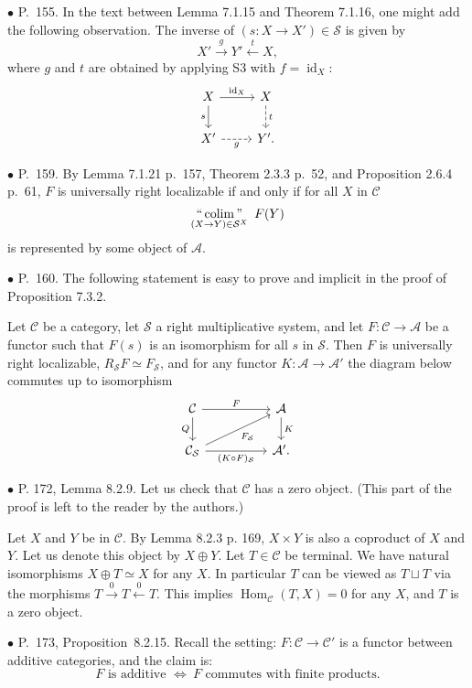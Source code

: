 \documentclass[12pt]{article}
\theoremstyle{remark}%
\newcommand{\bu}{\bullet}
\newcommand{\n}{\noindent}
\newcommand{\A}{\mathcal A}
\newcommand{\C}{\mathcal C}
\newcommand{\SSS}{\mathcal S}
\newcommand{\xl}{\xleftarrow}
\newcommand{\xr}{\xrightarrow}
\newcommand{\pr}{Proposition}
\DeclareMathOperator*{\coli}{colim}
\DeclareMathOperator*{\icolim}{``\coli"}
\DeclareMathOperator{\id}{id}
\DeclareMathOperator{\h}{Hom}
\begin{document}

\n$\bu$ P.~155. In the text between Lemma 7.1.15 and Theorem 7.1.16, one might add the following observation. The inverse of $(s:X\to X')\in\mathcal S$ is given by 
$$
X'\overset{g}{\to}Y'\overset{t}{\leftarrow}X,
$$
where $g$ and $t$ are obtained by applying S3 with $f=\id_X$:
$$
\begin{tikzcd}
X\ar{r}{\id_X}\ar{d}[swap]{s}&X\ar[dashed]{d}{t}\\ X'\ar[dashed]{r}[swap]{g}&Y'.
\end{tikzcd}
$$ 


\n$\bu$ P.~159. By Lemma 7.1.21 p.~157, Theorem 2.3.3 p.~52, and Proposition 2.6.4 p.~61, $F$ is universally right localizable if and only if for all $X$ in $\C$ 
$$
\icolim_{(X\to Y)\in\SSS^X}\ F(Y) 
$$
is represented by some object of $\A$. 


\n$\bu$ P.~160. The following statement is easy to prove and implicit in the proof of Proposition 7.3.2. 

Let $\C$ be a category, let $\SSS$ a right multiplicative system, and let $F:\C\to\A$ be a functor such that $F(s)$ is an isomorphism for all $s$ in $\SSS$. Then $F$ is universally right localizable, $R_{\SSS}F\simeq F_{\SSS}$, and for any functor $K:\A\to\A'$ the diagram below commutes up to isomorphism
$$
\begin{tikzcd}
\C\ar{rr}{F}\ar{d}[swap]{Q}&&\A\ar{d}{K}\\
\C_{\SSS}\ar{rr}[swap]{(K\circ F)_{\SSS}}\ar{rru}[swap]{F_{\SSS}}&&\A'.
\end{tikzcd}
$$ 


\n$\bu$ P. 172, Lemma 8.2.9. Let us check that $\C$ has a zero object. (This part of the proof is left to the reader by the authors.) 

Let $X$ and $Y$ be in $\C$. By Lemma 8.2.3 p. 169, $X\times Y$ is also a coproduct of $X$ and $Y$. Let us denote this object by $X\oplus Y$. Let $T\in\C$ be terminal. We have natural isomorphisms $X\oplus T\simeq X$ for any $X$. In particular $T$ can be viewed as $T\sqcup T$ via the morphisms $T\xr0T\xl0T$. This implies $\h_\C(T,X)=0$ for any $X$, and $T$ is a zero object. 


\n$\bu$ P.~173, \pr\ 8.2.15. Recall the setting: $F:\C\to\C'$ is a functor between additive categories, and the claim is: 
$$
F\text{ is additive }\iff\ F\text{ commutes with finite products}.
$$ 
\end{document}

